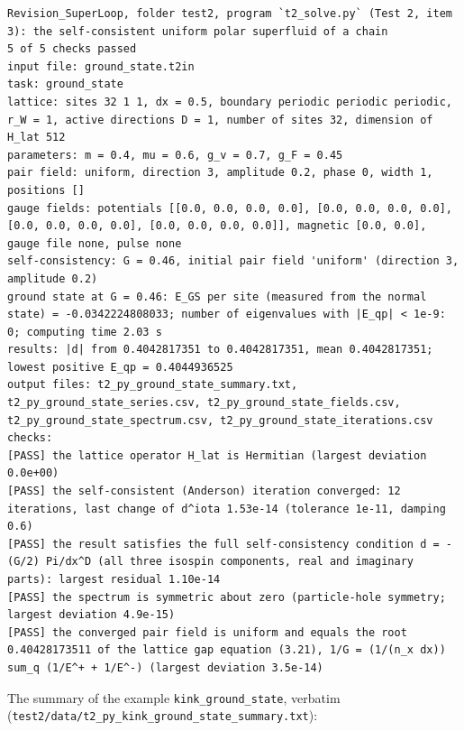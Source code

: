 \documentclass[
  10pt,
]{article}
\begin{document}
\begin{verbatim}
Revision_SuperLoop, folder test2, program `t2_solve.py` (Test 2, item 3): the self-consistent uniform polar superfluid of a chain
5 of 5 checks passed
input file: ground_state.t2in
task: ground_state
lattice: sites 32 1 1, dx = 0.5, boundary periodic periodic periodic, r_W = 1, active directions D = 1, number of sites 32, dimension of H_lat 512
parameters: m = 0.4, mu = 0.6, g_v = 0.7, g_F = 0.45
pair field: uniform, direction 3, amplitude 0.2, phase 0, width 1, positions []
gauge fields: potentials [[0.0, 0.0, 0.0, 0.0], [0.0, 0.0, 0.0, 0.0], [0.0, 0.0, 0.0, 0.0], [0.0, 0.0, 0.0, 0.0]], magnetic [0.0, 0.0], gauge file none, pulse none
self-consistency: G = 0.46, initial pair field 'uniform' (direction 3, amplitude 0.2)
ground state at G = 0.46: E_GS per site (measured from the normal state) = -0.0342224808033; number of eigenvalues with |E_qp| < 1e-9: 0; computing time 2.03 s
results: |d| from 0.4042817351 to 0.4042817351, mean 0.4042817351; lowest positive E_qp = 0.4044936525
output files: t2_py_ground_state_summary.txt, t2_py_ground_state_series.csv, t2_py_ground_state_fields.csv, t2_py_ground_state_spectrum.csv, t2_py_ground_state_iterations.csv
checks:
[PASS] the lattice operator H_lat is Hermitian (largest deviation 0.0e+00)
[PASS] the self-consistent (Anderson) iteration converged: 12 iterations, last change of d^iota 1.53e-14 (tolerance 1e-11, damping 0.6)
[PASS] the result satisfies the full self-consistency condition d = -(G/2) Pi/dx^D (all three isospin components, real and imaginary parts): largest residual 1.10e-14
[PASS] the spectrum is symmetric about zero (particle-hole symmetry; largest deviation 4.9e-15)
[PASS] the converged pair field is uniform and equals the root 0.40428173511 of the lattice gap equation (3.21), 1/G = (1/(n_x dx)) sum_q (1/E^+ + 1/E^-) (largest deviation 3.5e-14)
\end{verbatim}

The summary of the example \texttt{kink\_ground\_state}, verbatim
(\texttt{test2/data/t2\_py\_kink\_ground\_state\_summary.txt}):
\end{document}
